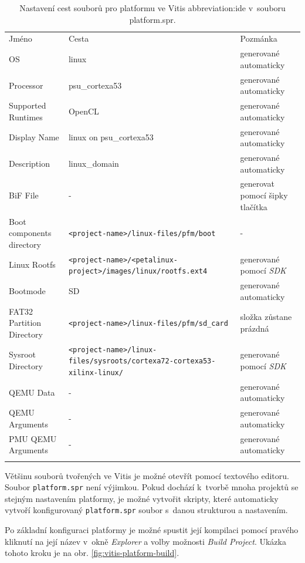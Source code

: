 \documentclass[a4paper, twoside, 11pt]{article}
\begin{document}
		\begin{table}[H]
			\centering
			\caption{Nastavení cest souborů pro platformu ve Vitis \gls{abbreviation:ide} v~souboru platform.spr.}
		  \vspace*{0.15cm}
		  \resizebox{\textwidth}{!}
		  {
			\begin{tabular}{!{\vrule width 2pt} l | l | l !{\vrule width 2pt}}
			Jméno & Cesta & Pozmánka\\
			OS & linux & generované automaticky\\ \hline
			Processor & psu\_cortexa53 & generované automaticky\\ \hline
			Supported Runtimes & OpenCL & generované automaticky\\ \hline
			Display Name & linux on psu\_cortexa53 & generované automaticky \\\hline
			Description & linux\_domain & generované automaticky\\ \hline
			BiF File & - & generovat pomocí šipky tlačítka\\ \hline
			Boot components directory & \texttt{<project-name>/linux-files/pfm/boot} & -\\ \hline
			Linux Rootfs & \texttt{<project-name>/<petalinux-project>/images/linux/rootfs.ext4} & generované pomocí \textit{SDK}\\ \hline
			Bootmode & SD & generované automaticky\\ \hline
			FAT32 Partition Directory & \texttt{<project-name>/linux-files/pfm/sd\_card} & složka zůstane prázdná\\ \hline
			Sysroot Directory & \texttt{<project-name>/linux-files/sysroots/cortexa72-cortexa53-xilinx-linux/} & generované pomocí \textit{SDK}\\ \hline
			QEMU Data & - & generované automaticky \\ \hline
			QEMU Arguments & - & generované automaticky \\ \hline
			PMU QEMU Arguments & - & generované automaticky \\
			\end{tabular}
		  }
			\label{tab:vitis-platform-spr-settings}
		\end{table}

		Většinu souborů tvořených ve Vitis je možné otevřít pomocí textového editoru. Soubor \texttt{platform.spr} není výjimkou. Pokud dochází k~tvorbě mnoha projektů se stejným nastavením platformy, je možné vytvořit skripty, které automaticky vytvoří konfigurovaný \texttt{platform.spr} soubor s~danou strukturou a nastavením.\par
		Po základní konfiguraci platformy je možné spustit její kompilaci pomocí pravého kliknutí na její název v~okně \textit{Explorer} a volby možnosti \textit{Build Project}. Ukázka tohoto kroku je na obr. \ref{fig:vitis-platform-build}.
\end{document}
